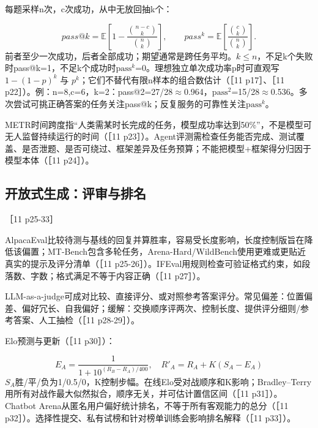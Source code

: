 \documentclass[UTF8,a4paper,zihao=-4,fontset=windows]{ctexart}
\newcommand{\source}[1]{{\small #1}\par}
\begin{document}
每题采样n次，c次成功，从中无放回抽k个：

\[pass@k=\mathbb E\left[1-\frac{\binom{n-c}{k}}{\binom nk}\right],\qquad pass^k=\mathbb E\left[\frac{\binom ck}{\binom nk}\right].\]
前者至少一次成功，后者全部成功；期望通常是跨任务平均。$k\le n$，不足k个失败时pass@k=1，不足k个成功时$\mathrm{pass}^{k}$=0。理想独立单次成功率p时可直观写 $1-(1-p)^k$ 与 $p^k$；它们不替代有限n样本的组合数估计（［11 p17］、［11 p22］）。例：n=8,c=6，k=2：pass@2=27/\allowbreak{}28\ensuremath{\approx}0.964，$\mathrm{pass}^{2}$=15/\allowbreak{}28\ensuremath{\approx}0.536。多次尝试可挑正确答案的任务关注pass@k；反复服务的可靠性关注$\mathrm{pass}^{k}$。

METR时间跨度指“人类需某时长完成的任务，模型成功率达到50\%”，不是模型可无人监督持续运行的时间（［11 p23］）。Agent评测需检查任务能否完成、测试覆盖、是否泄题、是否可绕过、框架差异及任务预算；不能把模型+框架得分归因于模型本体（［11 p24］）。

\subsection{开放式生成：评审与排名}
\source{［11 p25-33］}
AlpacaEval比较待测与基线的回复并算胜率，容易受长度影响，长度控制版旨在降低该偏置；MT-Bench包含多轮任务，Arena-Hard/\allowbreak{}WildBench使用更难或更贴近真实的提示及评分清单（［11 p25-26］）。IFEval用规则检查可验证格式约束，如段落数、字数；格式满足不等于内容正确（［11 p27］）。

LLM-as-a-judge可成对比较、直接评分、或对照参考答案评分。常见偏差：位置偏差、偏好冗长、自我偏好；缓解：交换顺序评两次、控制长度、提供评分细则/\allowbreak{}参考答案、人工抽检（［11 p28-29］）。

Elo预测与更新（［11 p30］）：

\[E_A=\frac1{1+10^{(R_B-R_A)/400}},\quad R'_A=R_A+K(S_A-E_A)\]
$S_A$胜/\allowbreak{}平/\allowbreak{}负为1/\allowbreak{}0.5/\allowbreak{}0，K控制步幅。在线Elo受对战顺序和K影响；Bradley--Terry用所有对战作最大似然拟合，顺序无关，并可估计置信区间（［11 p31］）。Chatbot Arena从匿名用户偏好统计排名，不等于所有客观能力的总分（［11 p32］）。选择性提交、私有试榜和针对榜单训练会影响排名解释（［11 p33］）。

\end{document}

